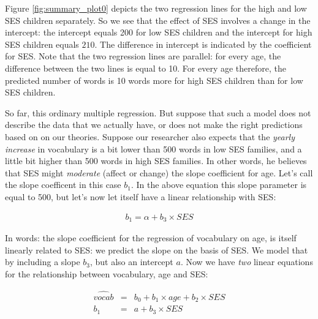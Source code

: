 Figure \ref{fig:summary_plot0} depicts the two regression lines for the high and low SES children separately. So we see that the effect of SES involves a change in the intercept: the intercept equals 200 for low SES children and the intercept for high SES children equals $210$. The difference in intercept is indicated by the coefficient for SES. Note that the two regression lines are parallel: for every age, the difference between the two lines is equal to 10. For every age therefore, the predicted number of words is 10 words more for high SES children than for low SES children.


\begin{knitrout}
\color{fgcolor}\begin{kframe}


{\ttfamily\noindent\bfseries{}}\end{kframe}
\end{knitrout}

So far, this ordinary multiple regression. But suppose that such a model does not describe the data that we actually have, or does not make the right predictions based on on our theories. Suppose our researcher also expects that the \textit{yearly increase} in vocabulary is a bit lower than 500 words in low SES families, and a little bit higher than 500 words in high SES families. In other words, he believes that SES might \textit{moderate} (affect or change) the slope coefficient for age. Let's call the slope coefficent in this case $b_1$. In the above equation this slope parameter is equal to 500, but let's now let itself have a linear relationship with SES:

\begin{eqnarray}
b_1 = \alpha + b_3 \times SES
\end{eqnarray}

In words: the slope coefficient for the regression of vocabulary on age, is itself linearly related to SES: we predict the slope on the basis of SES. We model that by including a slope $b_3$, but also an intercept $a$. Now we have \textit{two} linear equations for the relationship between vocabulary, age and SES:

\begin{eqnarray}
\widehat{vocab} &=& b_0 + b_1 \times age + b_2 \times SES  \\
b_1 &=& a + b_3 \times SES
\end{eqnarray}

